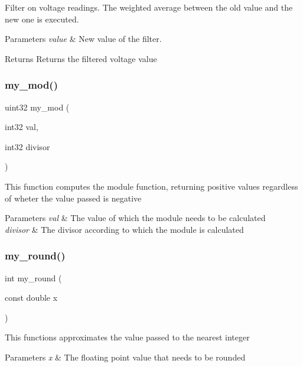 Filter on voltage readings. The weighted average between the old value and the new one is executed.


\begin{DoxyParams}{Parameters}
{\em value} & New value of the filter.\\
\hline
\end{DoxyParams}
\begin{DoxyReturn}{Returns}
Returns the filtered voltage value 
\end{DoxyReturn}
\mbox{\label{utils_8h_a01d3bb6c1fd469a6c530fb296e4fe0fe}} 
\subsubsection{my\+\_\+mod()}
{\footnotesize\ttfamily uint32 my\+\_\+mod (\begin{DoxyParamCaption}\item[{int32}]{val,  }\item[{int32}]{divisor }\end{DoxyParamCaption})}

This function computes the module function, returning positive values regardless of wheter the value passed is negative


\begin{DoxyParams}{Parameters}
{\em val} & The value of which the module needs to be calculated \\
\hline
{\em divisor} & The divisor according to which the module is calculated \\
\hline
\end{DoxyParams}
\mbox{\label{utils_8h_a1ea4108a2c530470624ce2678e65dcef}} 
\subsubsection{my\+\_\+round()}
{\footnotesize\ttfamily int my\+\_\+round (\begin{DoxyParamCaption}\item[{const double}]{x }\end{DoxyParamCaption})}

This functions approximates the value passed to the nearest integer


\begin{DoxyParams}{Parameters}
{\em x} & The floating point value that needs to be rounded \\
\hline
\end{DoxyParams}
